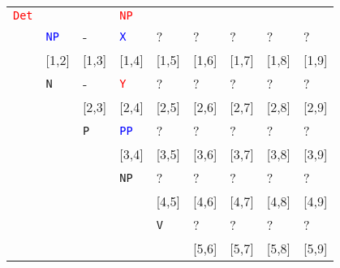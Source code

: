 \documentclass[a4paper]{article}
\begin{document}
\begin{enumerate}
\begin{enumerate}
\begin{enumerate}
\begin{itemize}
\begin{table}[hp]
\begin{tabular}{ccccccccc}
\multicolumn{1}{|l|}{\textcolor{red}{\texttt{Det}}} & \multicolumn{1}{l|}{} & \multicolumn{1}{l|}{} & \multicolumn{1}{l|}{\textcolor{red}{\texttt{NP}}} & \multicolumn{1}{l|}{} & \multicolumn{1}{l|}{} & \multicolumn{1}{l|}{} & \multicolumn{1}{l|}{} & \multicolumn{1}{l|}{} \\
\multicolumn{1}{|l|}{} & \multicolumn{1}{l|}{\textcolor{blue}{\texttt{NP}}} & \multicolumn{1}{l|}{-} & \multicolumn{1}{l|}{\textcolor{blue}{\texttt{X}}} & \multicolumn{1}{l|}{?} & \multicolumn{1}{l|}{?} & \multicolumn{1}{l|}{?} & \multicolumn{1}{l|}{?} & \multicolumn{1}{l|}{?} \\
\hline
 & \multicolumn{1}{|l|}{[1,2]} & \multicolumn{1}{l|}{[1,3]} & \multicolumn{1}{l|}{[1,4]} & \multicolumn{1}{l|}{[1,5]} & \multicolumn{1}{l|}{[1,6]} & \multicolumn{1}{l|}{[1,7]} & \multicolumn{1}{l|}{[1,8]} & \multicolumn{1}{l|}{[1,9]} \\
 & \multicolumn{1}{|l|}{\texttt{N}} & \multicolumn{1}{l|}{-} & \multicolumn{1}{l|}{\textcolor{red}{\texttt{Y}}} & \multicolumn{1}{l|}{?} & \multicolumn{1}{l|}{?} & \multicolumn{1}{l|}{?} & \multicolumn{1}{l|}{?} & \multicolumn{1}{l|}{?} \\
\cline{2-9}
 & & \multicolumn{1}{|l|}{[2,3]} & \multicolumn{1}{l|}{[2,4]} & \multicolumn{1}{l|}{[2,5]} & \multicolumn{1}{l|}{[2,6]} & \multicolumn{1}{l|}{[2,7]} & \multicolumn{1}{l|}{[2,8]} & \multicolumn{1}{l|}{[2,9]} \\
 & & \multicolumn{1}{|l|}{\texttt{P}} & \multicolumn{1}{l|}{\textcolor{blue}{\texttt{PP}}} & \multicolumn{1}{l|}{?} & \multicolumn{1}{l|}{?} & \multicolumn{1}{l|}{?} & \multicolumn{1}{l|}{?} & \multicolumn{1}{l|}{?} \\
\cline{3-9}
 & & & \multicolumn{1}{|l|}{[3,4]} & \multicolumn{1}{l|}{[3,5]} & \multicolumn{1}{l|}{[3,6]} & \multicolumn{1}{l|}{[3,7]} & \multicolumn{1}{l|}{[3,8]} & \multicolumn{1}{l|}{[3,9]} \\
 & & & \multicolumn{1}{|l|}{\texttt{NP}} & \multicolumn{1}{l|}{?} & \multicolumn{1}{l|}{?} & \multicolumn{1}{l|}{?} & \multicolumn{1}{l|}{?} & \multicolumn{1}{l|}{?} \\
\cline{4-9}
 & & & & \multicolumn{1}{|l|}{[4,5]} & \multicolumn{1}{l|}{[4,6]} & \multicolumn{1}{l|}{[4,7]} & \multicolumn{1}{l|}{[4,8]} & \multicolumn{1}{l|}{[4,9]} \\
 & & & & \multicolumn{1}{|l|}{\texttt{V}} & \multicolumn{1}{l|}{?} & \multicolumn{1}{l|}{?} & \multicolumn{1}{l|}{?} & \multicolumn{1}{l|}{?} \\
\cline{5-9}
 & & & & & \multicolumn{1}{|l|}{[5,6]} & \multicolumn{1}{l|}{[5,7]} & \multicolumn{1}{l|}{[5,8]} & \multicolumn{1}{l|}{[5,9]} \\

\end{tabular}
\end{table}
\end{itemize}
\end{enumerate}
\end{enumerate}
\end{enumerate}
\end{document}
